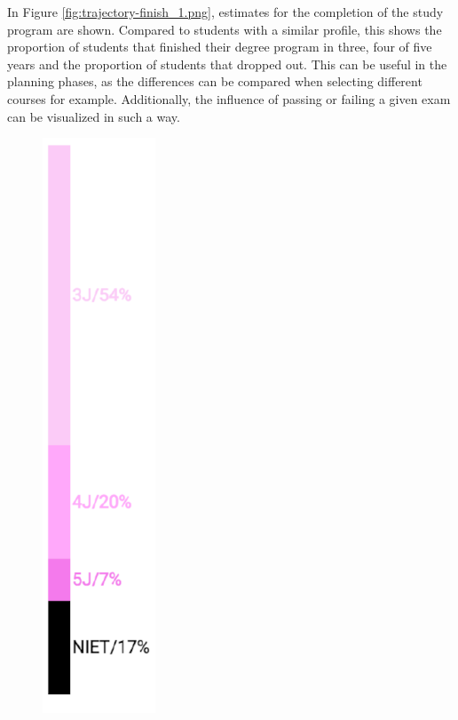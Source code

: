 In Figure \ref{fig:trajectory-finish_1.png}, estimates for the completion of the study program are shown. Compared to students with a similar profile, this shows the proportion of students that finished their degree program in three, four of five years and the proportion of students that dropped out. This can be useful in the planning phases, as the differences can be compared when selecting different courses for example. Additionally, the influence of passing or failing a given exam can be visualized in such a way.


\begin{figure}
    \begin{minipage}[b]{0.48\textwidth}
        \centering
        \includegraphics[width=0.3\textwidth]{figures/trajectory-finish_1.png}

\end{minipage}
\end{figure}
